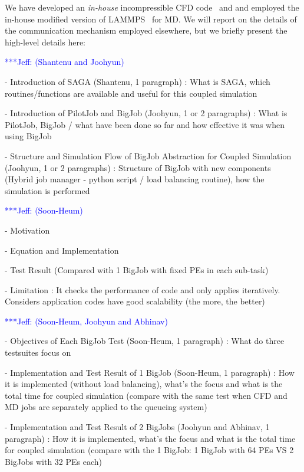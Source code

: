 \documentclass[times, 10pt,twocolumn]{article}
\newcommand{\skonote}[1]{ {\textcolor{blue} { ***Jeff: #1 }}}
\newcommand{\skonote}[1]{}
\begin{document}
We have developed an {\it in-house} incompressible CFD code~\cite{Lee:2006} and and employed the in-house modified version of LAMMPS~\cite{LAMMPS} for MD. We will report on the details of the communication mechanism employed elsewhere, but
we briefly present the high-level details here:

\skonote{(Shantenu and Joohyun)}

- Introduction of SAGA (Shantenu, 1 paragraph)
: What is SAGA, which routines/functions are available and useful for this coupled simulation

- Introduction of PilotJob and BigJob (Joohyun, 1 or 2 paragraphs)
: What is PilotJob, BigJob / what have been done so far and how effective it was when using BigJob

- Structure and Simulation Flow of BigJob Abstraction for Coupled Simulation (Joohyun, 1 or 2 paragraphs)
: Structure of BigJob with new components (Hybrid job manager - python script / load balancing routine), how the simulation is performed


\skonote{(Soon-Heum)}

- Motivation

- Equation and Implementation

- Test Result (Compared with 1 BigJob with fixed PEs in each sub-task)

- Limitation
: It checks the performance of code and only applies iteratively. Considers application codes have good scalability (the more, the better)


\skonote{(Soon-Heum, Joohyun and Abhinav)}

- Objectives of Each BigJob Test (Soon-Heum, 1 paragraph)
: What do three testsuites focus on

- Implementation and Test Result of 1 BigJob (Soon-Heum, 1 paragraph)
: How it is implemented (without load balancing), what's the focus and what is the total time for coupled simulation (compare with the same test when CFD and MD jobs are separately applied to the queueing system)

- Implementation and Test Result of 2 BigJobs (Joohyun and Abhinav, 1 paragraph)
: How it is implemented, what's the focus and what is the total time for coupled simulation (compare with the 1 BigJob: 1 BigJob with 64 PEs VS 2 BigJobs with 32 PEs each)
\end{document}
